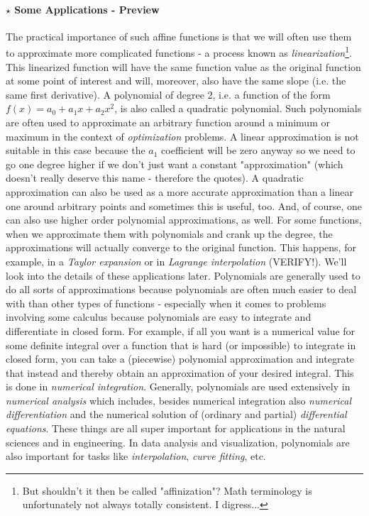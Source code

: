 \paragraph{$\star$ Some Applications - Preview}
The practical importance of such affine functions is that we will often use them to approximate more complicated functions - a process known as \emph{linearization}\footnote{But shouldn't it then be called "affinization"? Math terminology is unfortunately not always totally consistent. I digress...}. This linearized function will have the same function value as the original function at some point of interest and will, moreover, also have the same slope (i.e. the same first derivative). A polynomial of degree 2, i.e. a function of the form $f(x) = a_0 + a_1 x + a_2 x^2$, is also called a quadratic polynomial. Such polynomials are often used to approximate an arbitrary function around a minimum or maximum in the context of \emph{optimization} problems. A linear approximation is not suitable in this case because the $a_1$ coefficient will be zero anyway so we need to go one degree higher if we don't just want a constant "approximation" (which doesn't really deserve this name - therefore the quotes). A quadratic approximation can also be used as a more accurate approximation than a linear one around arbitrary points and sometimes this is useful, too. And, of course, one can also use higher order polynomial approximations, as well. For some functions, when we approximate them with polynomials and crank up the degree, the approximations will actually converge to the original function. This happens, for example, in a \emph{Taylor expansion} or in \emph{Lagrange interpolation} (VERIFY!). We'll look into the details of these applications later. Polynomials are generally used to do all sorts of approximations because polynomials are often much easier to deal with than other types of functions - especially when it comes to problems involving some calculus because polynomials are easy to integrate and differentiate in closed form. For example, if all you want is a numerical value for some definite integral over a function that is hard (or impossible) to integrate in closed form, you can take a (piecewise) polynomial approximation and integrate that instead and thereby obtain an approximation of your desired integral. This is done in \emph{numerical integration}. Generally, polynomials are used extensively in \emph{numerical analysis} which includes, besides numerical integration also \emph{numerical differentiation} and the numerical solution of (ordinary and partial) \emph{differential equations}. These things are all super important for applications in the natural sciences and in engineering. In data analysis and visualization, polynomials are also important for tasks like \emph{interpolation}, \emph{curve fitting}, etc.

